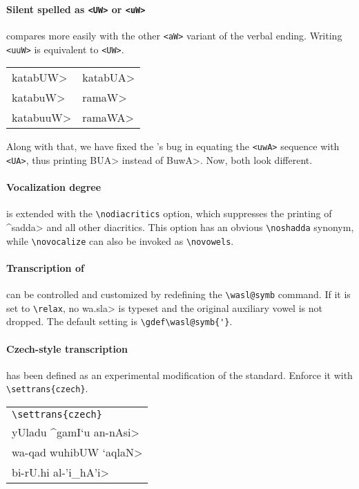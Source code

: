 \documentclass[10pt,a4paper]{article}
\newcommand{\exts}[1]{\lstinline|<#1>|}
\newcommand{\orth}[1]{{\showfalse\arabtrue\transfalse\<#1>}}
\newcommand{\phon}[1]{{\showfalse\arabfalse\transtrue\<#1>\/}}
\begin{document}
\paragraph{Silent \protect\phon{'alif} spelled as \protect\exts{UW}
           or \protect\exts{uW}}
compares more easily with the other \linebreak \exts{aW} variant of
the verbal ending. Writing \exts{uuW} is equivalent to \exts{UW}.

\medskip

\begin{tabular}{p{.5\linewidth}l}
\<katabUW>      &   \<katabUA>  \\
\<katabuW>      &   \<ramaW>    \\
\<katabuuW>     &   \<ramaWA>   \\
\end{tabular}

\bigskip

Along with that, we have fixed the \ArabTeX's bug in equating the
\exts{uwA} sequence with \exts{UA}, thus printing \orth{BUA} instead
of \orth{BuwA}. Now, both look different.

\paragraph{Vocalization degree}
is extended with the \lstinline|\nodiacritics| option, which suppresses the
printing of \phon{^sadda} and all other diacritics. This option has an
obvious \lstinline|\noshadda| synonym, while \lstinline|\novocalize| can also be
invoked as \lstinline|\novowels|.

\paragraph{Transcription of \protect\phon{wa.sla}}
can be controlled and customized by redefining the \lstinline|\wasl@symb|
command. If it is set to \lstinline|\relax|, no \phon{wa.sla} is typeset
and the original auxiliary vowel is not dropped. The default setting
is \lstinline|\gdef\wasl@symb{'}|.

\paragraph{Czech-style transcription}
has been defined as an experimental modification of the
standard. Enforce it with \lstinline|\settrans{czech}|.

\bigskip

\begin{tabular}{l}
\lstinline|\settrans{czech}|    \\[6pt]
\<yUladu ^gamI`u an-nAsi>       \\
\<wa-qad wuhibUW `aqlaN>        \\
\<bi-rU.hi al-'i_hA'i>          \\
\end{tabular}
\end{document}
